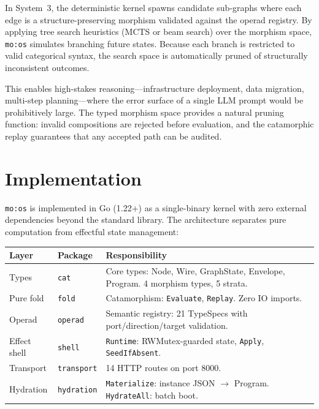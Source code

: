 \documentclass[submission,copyright,creativecommons]{eptcs}
\begin{document}
In System~3, the deterministic kernel spawns candidate sub-graphs where each
edge is a structure-preserving morphism validated against the operad registry.
By applying tree search heuristics (MCTS or beam search) over the morphism
space, \texttt{mo:os} simulates branching future states. Because each branch
is restricted to valid categorical syntax, the search space is automatically
pruned of structurally inconsistent outcomes.

This enables high-stakes reasoning---infrastructure deployment, data
migration, multi-step planning---where the error surface of a single LLM
prompt would be prohibitively large. The typed morphism space provides a
natural pruning function: invalid compositions are rejected before evaluation,
and the catamorphic replay guarantees that any accepted path can be audited.

\section{Implementation}
\label{sec:implementation}



\texttt{mo:os} is implemented in Go (1.22+) as a single-binary kernel with
zero external dependencies beyond the standard library. The architecture
separates pure computation from effectful state management:

\begin{center}
\begin{tabular}{@{}llp{5.5cm}@{}}
\toprule
Layer & Package & Responsibility \\
\midrule
Types      & \texttt{cat}       & Core types: Node, Wire, GraphState, Envelope, Program. 4 morphism types, 5 strata. \\
Pure fold  & \texttt{fold}      & Catamorphism: \texttt{Evaluate}, \texttt{Replay}. Zero IO imports. \\
Operad     & \texttt{operad}    & Semantic registry: 21 TypeSpecs with port/direction/target validation. \\
Effect shell & \texttt{shell}   & \texttt{Runtime}: RWMutex-guarded state, \texttt{Apply}, \texttt{SeedIfAbsent}. \\
Transport  & \texttt{transport} & 14 HTTP routes on port 8000. \\
Hydration  & \texttt{hydration} & \texttt{Materialize}: instance JSON $\to$ Program. \texttt{HydrateAll}: batch boot. \\
\bottomrule
\end{tabular}
\end{center}
\end{document}
